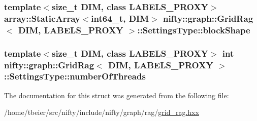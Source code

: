 \subsubsection[{block\+Shape}]{\setlength{\rightskip}{0pt plus 5cm}template$<$size\+\_\+t D\+I\+M, class L\+A\+B\+E\+L\+S\+\_\+\+P\+R\+O\+X\+Y$>$ {\bf array\+::\+Static\+Array}$<$int64\+\_\+t, D\+I\+M$>$ {\bf nifty\+::graph\+::\+Grid\+Rag}$<$ D\+I\+M, L\+A\+B\+E\+L\+S\+\_\+\+P\+R\+O\+X\+Y $>$\+::Settings\+Type\+::block\+Shape}\label{structnifty_1_1graph_1_1GridRag_1_1SettingsType_a08a6ef3ff2a5bf6b61d4b52179ba29c7}
\hypertarget{structnifty_1_1graph_1_1GridRag_1_1SettingsType_a2296f315ec18eac36fd00c16d43fb6a7}{}
\subsubsection[{number\+Of\+Threads}]{\setlength{\rightskip}{0pt plus 5cm}template$<$size\+\_\+t D\+I\+M, class L\+A\+B\+E\+L\+S\+\_\+\+P\+R\+O\+X\+Y$>$ int {\bf nifty\+::graph\+::\+Grid\+Rag}$<$ D\+I\+M, L\+A\+B\+E\+L\+S\+\_\+\+P\+R\+O\+X\+Y $>$\+::Settings\+Type\+::number\+Of\+Threads}\label{structnifty_1_1graph_1_1GridRag_1_1SettingsType_a2296f315ec18eac36fd00c16d43fb6a7}


The documentation for this struct was generated from the following file\+:\begin{DoxyCompactItemize}
\item 
/home/tbeier/src/nifty/include/nifty/graph/rag/\hyperlink{grid__rag_8hxx}{grid\+\_\+rag.\+hxx}\end{DoxyCompactItemize}
